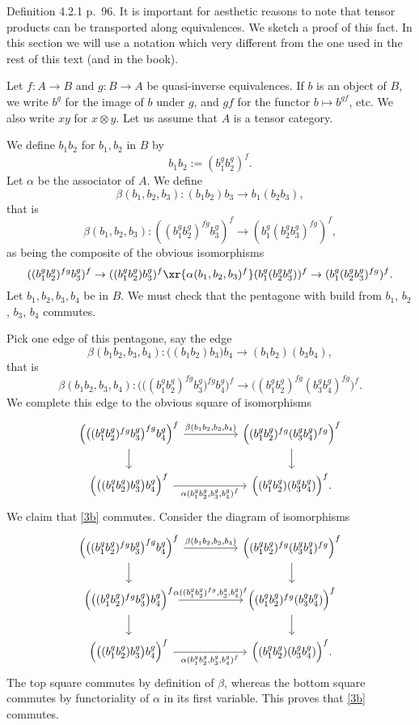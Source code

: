\documentclass[12pt]{article}
\theoremstyle{remark}
\theoremstyle{definition}
\begin{document}
%

\begin{s}
Definition 4.2.1 p.~96. It is important for aesthetic reasons to note that tensor products can be transported  along equivalences. We sketch a proof of this fact. In this section we will use a notation which very different from the one used in the rest of this text (and in the book). 

Let $f:A\to B$ and $g:B\to A$ be quasi-inverse equivalences. If $b$ is an object of $B$, we write $b^g$ for the image of $b$ under $g$, and $gf$ for the functor $b\mapsto b^{gf}$, etc. We also write $xy$ for $x\otimes y$. Let us assume that $A$ is a tensor category.  %

We define $b_1b_2$ for $b_1,b_2$ in $B$ by 
$$
b_1b_2:=(b_1^gb_2^g)^f.
$$ 
Let $\alpha$ be the associator of $A$. We define %
$$
\beta(b_1,b_2,b_3):(b_1b_2)b_3\to b_1(b_2b_3),
$$ 
that is 
$$
\beta(b_1,b_2,b_3):((b_1^gb_2^g)^{fg}b_3^g)^f\to(b_1^g(b_2^gb_3^g)^{fg})^f,
$$ 
as being the composite of the obvious isomorphisms 
$$ 
((b_1^gb_2^g)^{fg}b_3^g)^f\to((b_1^gb_2^g)b_3^g)^f\xr{\alpha(b_1,b_2,b_3)^f}(b_1^g(b_2^gb_3^g))^f\to(b_1^g(b_2^gb_3^g)^{fg})^f.
$$ 
Let $b_1,b_2,b_3,b_4$ be in $B$. We must check that the pentagone with build from $b_1$, $b_2$, $b_3$, $b_4$ commutes. 

Pick one edge of this pentagone, say the edge 
$$
\beta(b_1b_2,b_3,b_4):\big((b_1b_2)b_3\big)b_4\to(b_1b_2)(b_3b_4), 
$$ 
that is 
$$
\beta(b_1b_2,b_3,b_4):\Big(\big((b_1^gb_2^g)^{fg}b_3^g\big)^{fg}b_4^g\Big)^f\to\Big((b_1^gb_2^g)^{fg}(b_3^gb_4^g)^{fg}\Big)^f.
$$ 
We complete this edge to the obvious square of isomorphisms 
\begin{equation}\label{3b}
\begin{tikzcd}
\Big(\big((b_1^gb_2^g)^{fg}b_3^g\big)^{fg}b_4^g\Big)^f\ar[d]\ar{rr}{\beta(b_1b_2,b_3,b_4)}&&\Big((b_1^gb_2^g)^{fg}(b_3^gb_4^g)^{fg}\Big)^f\ar[d]\\
\Big(\big((b_1^gb_2^g)b_3^g\big)b_4^g\Big)^f\ar{rr}[swap]{\alpha(b_1^gb_2^g,b_3^g,b_4^g)^f}&&\Big((b_1^gb_2^g)(b_3^gb_4^g)\Big)^f.
\end{tikzcd}
\end{equation} 
We claim that \eqref{3b} commutes. Consider the diagram of isomorphisms 
$$%
\begin{tikzcd}
\Big(\big((b_1^gb_2^g)^{fg}b_3^g\big)^{fg}b_4^g\Big)^f\ar[d]\ar{rr}{\beta(b_1b_2,b_3,b_4)}&&\Big((b_1^gb_2^g)^{fg}(b_3^gb_4^g)^{fg}\Big)^f\ar[d]\\
\Big(\big((b_1^gb_2^g)^{fg}b_3^g\big)b_4^g\Big)^f\ar{rr}{\alpha((b_1^gb_2^g)^{fg},b_3^g,b_4^g)^f}\ar[d]&&\Big((b_1^gb_2^g)^{fg}(b_3^gb_4^g)\Big)^f\ar[d]\\ 
\Big(\big((b_1^gb_2^g)b_3^g\big)b_4^g\Big)^f\ar{rr}[swap]{\alpha(b_1^gb_2^g,b_3^g,b_4^g)^f}&&\Big((b_1^gb_2^g)(b_3^gb_4^g)\Big)^f.
\end{tikzcd}
$$%
The top square commutes by definition of $\beta$, whereas the bottom square commutes by functoriality of $\alpha$ in its first variable. This proves that \eqref{3b} commutes. 


\end{s}
\end{document}
